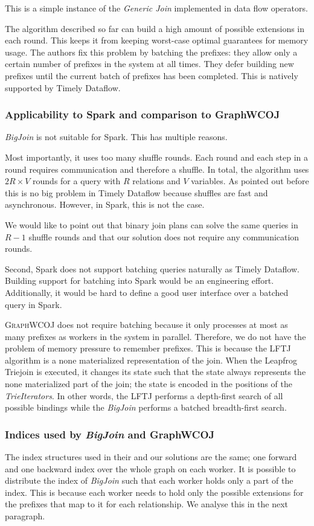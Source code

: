 This is a simple instance of the \textit{Generic Join} implemented in data flow operators.

The algorithm described so far can build a high amount of possible extensions in each round.
This keeps it from keeping worst-case optimal guarantees for memory usage.
The authors fix this problem by batching the prefixes:
they allow only a certain number of prefixes in the system at all times.
They defer building new prefixes until the current batch of prefixes has been completed.
This is natively supported by Timely Dataflow.

\subsubsection{Applicability to Spark and comparison to GraphWCOJ}
\textit{BigJoin} is not suitable for Spark.
This has multiple reasons.

Most importantly, it uses too many shuffle rounds.
Each round and each step in a round requires communication and therefore a shuffle.
In total, the algorithm uses $2R \times V$ rounds for a query with $R$ relations and $V$ variables.
As pointed out before this is no big problem in Timely Dataflow because shuffles are fast and asynchronous.
However, in Spark, this is not the case.

We would like to point out that binary join plans can solve the same queries in $R - 1$ shuffle rounds and
that our solution does not require any communication rounds.

Second, Spark does not support batching queries naturally as Timely Dataflow.
Building support for batching into Spark would be an engineering effort.
Additionally, it would be hard to define a good user interface over a batched query in Spark.

\textsc{GraphWCOJ} does not require batching because it only processes at most as many prefixes as workers in the system in parallel.
Therefore, we do not have the problem of memory pressure to remember prefixes.
This is because the \textsc{LFTJ} algorithm is a none materialized representation of the join.
When the Leapfrog Triejoin is executed, it changes its state such that the state always represents the none materialized
part of the join;
the state is encoded in the positions of the \textit{TrieIterators}.
In other words, the \textsc{LFTJ} performs a depth-first search of all possible bindings while the \textit{BigJoin}
performs a batched breadth-first search.

\subsubsection{Indices used by \textit{BigJoin} and GraphWCOJ}
The index structures used in their and our solutions are the same; one forward and one backward index over the whole graph on each
worker.
It is possible to distribute the index of \textit{BigJoin} such that each worker holds only a part
of the index.
This is because each worker needs to hold only the possible extensions for the prefixes that map to it for each relationship.
We analyse this in the next paragraph.

